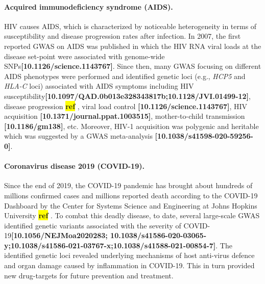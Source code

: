 \documentclass[12pt,usletter,fancy]{elegantbook}
\newcommand{\reqref}[1][ref]{
  \colorbox{yellow}{\textbf{#1}}
}
\begin{document}
\paragraph*{Acquired immunodeficiency syndrome (AIDS).}
HIV causes AIDS, which is characterized by noticeable heterogeneity in terms of susceptibility and disease progression rates after infection.
In 2007, the first reported GWAS on AIDS was published in which the HIV RNA viral loads at the disease set-point were associated with genome-wide SNPs\textbf{[10.1126/science.1143767]}.
Since then, many GWAS focusing on different AIDS phenotypes were performed and identified genetic loci (e.g., \textit{HCP5} and \textit{HLA-C} loci) associated with AIDS symptoms including HIV susceptibility\textbf{[10.1097/QAD.0b013e328343817b;10.1128/JVI.01499-12]}, disease progression \reqref, viral load control \textbf{[10.1126/science.1143767]}, HIV acquisition \textbf{[10.1371/journal.ppat.1003515]}, mother-to-child transmission \textbf{[10.1186/gm138]}, etc.
Moreover, HIV-1 acquisition was polygenic and heritable which was suggested by a GWAS meta-analysis \textbf{[10.1038/s41598-020-59256-0]}.

\paragraph*{Coronavirus disease 2019 (COVID-19).}
Since the end of 2019, the COVID-19 pandemic has brought about hundreds of millions confirmed cases and millions reported death according to the COVID-19 Dashboard by the Center for Systems Science and Engineering at Johns Hopkins University\reqref.
To combat this deadly disease, to date, several large-scale GWAS identified genetic variants associated with the severity of COVID-19\textbf{[10.1056/NEJMoa2020283; 10.1038/s41586-020-03065-y;10.1038/s41586-021-03767-x;10.1038/s41588-021-00854-7]}.
The identified genetic loci revealed underlying mechanisms of host anti-virus defence and organ damage caused by inflammation in COVID-19.
This in turn provided new drug-targets for future prevention and treatment.
\end{document}
